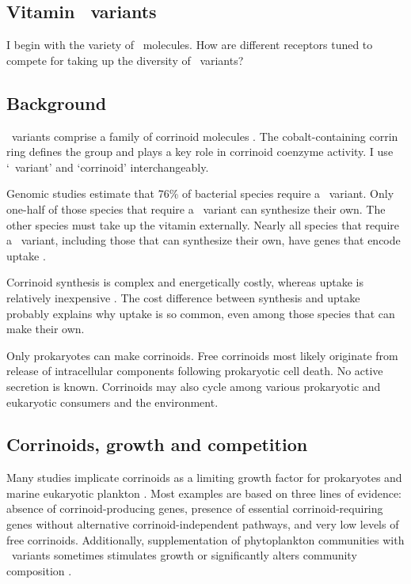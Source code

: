 \documentclass[\mydocfontsize]{article}
\begin{document}
\begin{multicols}{2}
\section{Vitamin \btb\ variants}

I begin with the variety of \bt\ molecules. How are different receptors tuned to compete for taking up the diversity of \bt\ variants?

\subsection{Background} 

\bt\ variants comprise a family of corrinoid molecules \autocite{roth96cobalamin,matthews09cobalamin-and}. The cobalt-containing corrin ring defines the group and plays a key role in corrinoid coenzyme activity. I use `\bt\ variant' and `corrinoid' interchangeably. 

Genomic studies estimate that 76\% of bacterial species require a \bt\ variant. Only one-half of those species that require a \bt\ variant can synthesize their own. The other species must take up the vitamin externally. Nearly all species that require a \bt\ variant, including those that can synthesize their own, have genes that encode uptake \autocite{zhang09comparative}. 

Corrinoid synthesis is complex and energetically costly, whereas uptake is relatively inexpensive \autocite{roth96cobalamin}.  The cost difference between synthesis and uptake probably explains why uptake is so common, even among those species that can make their own.

Only prokaryotes can make corrinoids. Free corrinoids most likely originate from release of intracellular components following prokaryotic cell death. No active secretion is known. Corrinoids may also cycle among various prokaryotic and eukaryotic consumers and the environment.

\subsection{Corrinoids, growth and competition} 

Many studies implicate corrinoids as a limiting growth factor for prokaryotes and marine eukaryotic plankton \autocite{zhang09comparative,sanudo-wilhelmy14the-role}. Most examples are based on three lines of evidence: absence of corrinoid-producing genes, presence of essential corrinoid-requiring genes without alternative corrinoid-independent pathways, and very low levels of free corrinoids. Additionally, supplementation of phytoplankton communities with \bt\ variants sometimes stimulates growth or significantly alters community composition \autocite{koch11the-effect,sanudo-wilhelmy14the-role}. 


\end{multicols}
\end{document}
